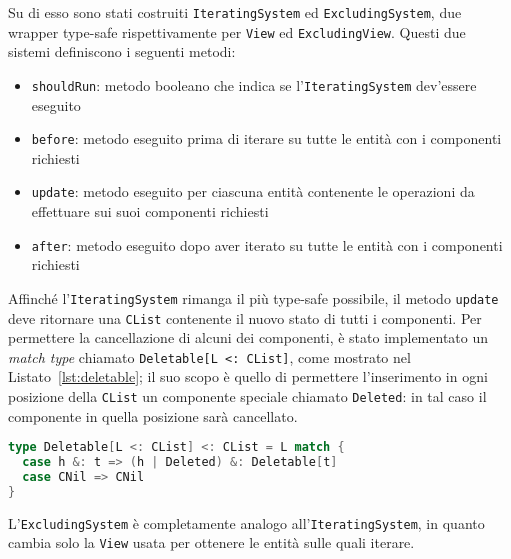 Su di esso sono stati costruiti \texttt{IteratingSystem} ed \texttt{ExcludingSystem}, due wrapper type-safe
rispettivamente per \texttt{View} ed \texttt{ExcludingView}.
Questi due sistemi definiscono i seguenti metodi:
\begin{itemize}
    \item \texttt{shouldRun}: metodo booleano che indica se l'\texttt{IteratingSystem} dev'essere eseguito
    \item \texttt{before}: metodo eseguito prima di iterare su tutte le entità con i componenti richiesti
    \item \texttt{update}: metodo eseguito per ciascuna entità contenente le operazioni da effettuare sui suoi
    componenti richiesti
    \item \texttt{after}: metodo eseguito dopo aver iterato su tutte le entità con i componenti richiesti
\end{itemize}

Affinché l'\texttt{IteratingSystem} rimanga il più type-safe possibile, il metodo \texttt{update} deve ritornare una
\texttt{CList} contenente il nuovo stato di tutti i componenti.
Per permettere la cancellazione di alcuni dei componenti, è stato implementato un \textit{match type} chiamato
\texttt{Deletable[L~<:~CList]}, come mostrato nel Listato~\ref{lst:deletable};
il suo scopo è quello di permettere l'inserimento in ogni posizione della \texttt{CList} un componente speciale chiamato
\texttt{Deleted}: in tal caso il componente in quella posizione sarà cancellato.

\begin{lstlisting}[language=Scala,label={lst:deletable},caption=Implementazione del tipo \texttt{Deletable[L~<:~CList]}]
type Deletable[L <: CList] <: CList = L match {
  case h &: t => (h | Deleted) &: Deletable[t]
  case CNil => CNil
}
\end{lstlisting}

L'\texttt{ExcludingSystem} è completamente analogo all'\texttt{IteratingSystem}, in quanto cambia solo la \texttt{View}
usata per ottenere le entità sulle quali iterare.